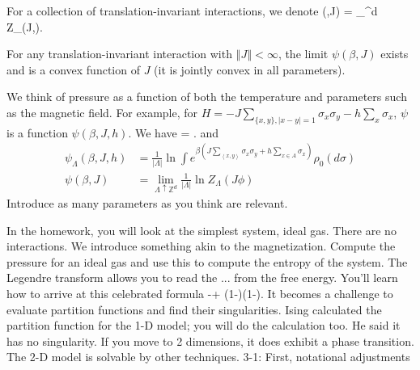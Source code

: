 \documentclass[12pt]{book}
\theoremstyle{norm}
\begin{document}
For a collection of translation-invariant interactions, we denote 
\be
\psi(\beta,J) = \lim_{\lambda \uparrow {}^d}  \ln Z_{\Lambda}(J,\phi).
\ee
\begin{theorem}\label{thm:j-limit}
For any translation-invariant interaction with $\left\Vert {J}\right\Vert<\infty$, %
the limit 
$
\psi(\beta, J) 
$
exists and is a convex function of $J$ (it is jointly convex in all parameters). 
\end{theorem}
We think of pressure as a function of both the temperature and parameters such as the magnetic field.
For example, for $H=-J\sum_{\{x,y\},|x-y|=1} \sigma_x\sigma_y - h\sum_x \sigma_x$, %
$\psi$ is a function $\psi(\beta, J,h)$. We have
\be
{} = \beta\left{}\right\rangle.
\ee
and
\begin{align*}
\psi_{\Lambda}(\beta, J, h) &= \frac{1}{|\Lambda|} \ln \int e^{\beta(J\sum_{\left\langle {x,y}\right\rangle} \sigma_x\sigma_y+ h\sum_{x\in A} \sigma_x)}\rho_0(d\sigma)\\
\psi(\beta,J) &= \lim_{\Lambda\uparrow \mathbb{Z}^d} \frac{1}{|\Lambda|}\ln Z_{\Lambda}(J\phi)
\end{align*}
Introduce as many parameters as you think are relevant.

In the homework, you will look at the simplest system, ideal gas. There are no interactions. We introduce something akin to the magnetization. Compute the pressure for an ideal gas and use this to compute the entropy of the system. The Legendre transform allows you to read the ... from the free energy. You'll learn how to arrive at this celebrated formula 
\be
-\rho\ln \rho + (1-\rho)\ln (1-\rho).
\ee
It becomes a challenge to evaluate partition functions and find their singularities. Ising calculated the partition function for the 1-D model; you will do the calculation too. He said it has no singularity. If you move to 2 dimensions, it does exhibit a phase transition. %
The 2-D model is solvable by other techniques.
{\color{blue}3-1: First, notational adjustments}
\end{document}

